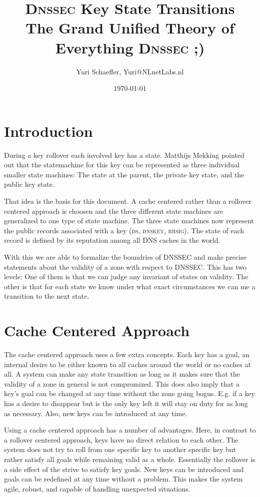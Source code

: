 \documentclass[twoside,english, a4paper]{article}
\title{\textsc{Dnssec} Key State Transitions \\ \small The Grand Unified Theory of Everything \textsc{Dnssec} ;)}
\author{Yuri Schaeffer, Yuri@NLnetLabs.nl}
\date{\today}
\begin{document}
\maketitle
\tableofcontents

\section{Introduction}

During a key rollover each involved key has a state. Matthijs 
Mekking pointed out that the statemachine for this key can be 
represented as three individual smaller state machines: The state at 
the parent, the private key state, and the public key state. 

That idea is the basis for this document. A cache centered rather 
than a rollover centered approach is choosen and the three different 
state machines are generalized to one type of state machine. The three
state machines now represent the public records associated with a key 
(\textsc{ds}, \textsc{dnskey}, \textsc{rrsig}). The state of each record is defined by its 
reputation among all DNS caches in the world. 

With this we are able to formalize the boundries of DNSSEC and make
precise statements about the validity of a zone with respect to DNSSEC.
This has two levels: One of them is that we can judge any invariant of
states on validity. The other is that for each state we know under
what exact circumstances we can me a transition to the next state.

\section{Cache Centered Approach}

The cache centered approach uses a few extra concepts. Each key has 
a goal, an internal desire to be either known to all caches around 
the world or no caches at all. A system can make any state 
transition as long as it makes sure that the validity of a zone in 
general is not compromized. This does also imply that a key's goal can
be changed at any time without the zone going bogus. E.g. if a key has
a desire to disappear but is the only key left it will stay on duty for
as long as necessary. Also, new keys can be introduced at any time.

Using a cache centered approach has a number of advantages. Here, in 
contrast to a rollover centered approach, keys have no direct 
relation to each other. The system does not try to roll from one 
specific key to another specific key but rather satisfy all goals 
while remaining valid as a whole. Essentially the rollover is a side 
effect of the strive to satisfy key goals. New keys can be 
introduced and goals can be redefined at any time without a problem. 
This makes the system agile, robust, and capable of handling unexpected
situations.
\end{document}
